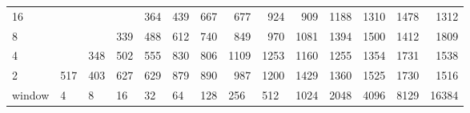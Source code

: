 \begin{table}[h]
{\begin{tabular}{lrrrrrrrrrrrrr}
			\multicolumn{1}{|l|}{16} &  &  &  & \cellcolor[HTML]{99E600}364 & \cellcolor[HTML]{99E600}439 & \cellcolor[HTML]{E69900}667 & \cellcolor[HTML]{E69900}677 & \cellcolor[HTML]{E60000}924 & \cellcolor[HTML]{E60000}909 & \cellcolor[HTML]{9900E6}1188 & \cellcolor[HTML]{9900E6}1310 & \cellcolor[HTML]{9900E6}1478 & \cellcolor[HTML]{9900E6}1312 \\ \cline{1-1}
			\multicolumn{1}{|l|}{8} &  &  & \cellcolor[HTML]{99E600}339 & \cellcolor[HTML]{99E600}488 & \cellcolor[HTML]{E69900}612 & \cellcolor[HTML]{E69900}740 & \cellcolor[HTML]{E60000}849 & \cellcolor[HTML]{E60000}970 & \cellcolor[HTML]{E60000}1081 & \cellcolor[HTML]{9900E6}1394 & \cellcolor[HTML]{9900E6}1500 & \cellcolor[HTML]{9900E6}1412 & \cellcolor[HTML]{4C00E6}1809 \\ \cline{1-1}
			\multicolumn{1}{|l|}{4} &  & \cellcolor[HTML]{99E600}348 & \cellcolor[HTML]{99E600}502 & \cellcolor[HTML]{E69900}555 & \cellcolor[HTML]{E60000}830 & \cellcolor[HTML]{E69900}806 & \cellcolor[HTML]{E60000}1109 & \cellcolor[HTML]{9900E6}1253 & \cellcolor[HTML]{9900E6}1160 & \cellcolor[HTML]{9900E6}1255 & \cellcolor[HTML]{9900E6}1354 & \cellcolor[HTML]{4C00E6}1731 & \cellcolor[HTML]{4C00E6}1538 \\ \cline{1-1}
			\multicolumn{1}{|l|}{2} & \cellcolor[HTML]{E69900}517 & \cellcolor[HTML]{99E600}403 & \cellcolor[HTML]{E69900}627 & \cellcolor[HTML]{E69900}629 & \cellcolor[HTML]{E60000}879 & \cellcolor[HTML]{E60000}890 & \cellcolor[HTML]{E60000}987 & \cellcolor[HTML]{9900E6}1200 & \cellcolor[HTML]{4C00E6}1429 & \cellcolor[HTML]{9900E6}1360 & \cellcolor[HTML]{4C00E6}1525 & \cellcolor[HTML]{4C00E6}1730 & \cellcolor[HTML]{4C00E6}1516 \\ \hline
			\multicolumn{1}{l|}{window} & \multicolumn{1}{l|}{4} & \multicolumn{1}{l|}{8} & \multicolumn{1}{l|}{16} & \multicolumn{1}{l|}{32} & \multicolumn{1}{l|}{64} & \multicolumn{1}{l|}{128} & \multicolumn{1}{l|}{256} & \multicolumn{1}{l|}{512} & \multicolumn{1}{l|}{1024} & \multicolumn{1}{l|}{2048} & \multicolumn{1}{l|}{4096} & \multicolumn{1}{l|}{8129} & \multicolumn{1}{l|}{16384} \\ \cline{2-14} 
		\end{tabular}
	}
\end{table}

